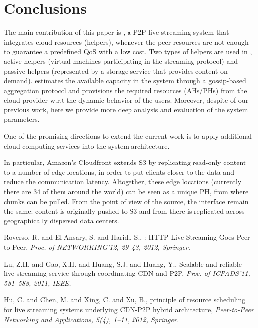 {\section{Conclusions} \label{sec:conclusion}

The main contribution of this paper is \clive, a P2P live streaming system
that integrates cloud resources (helpers), whenever the peer resources are not
enough to guarantee a predefined QoS with a low cost. Two types of helpers are
used in \clive, active helpers (virtual machines participating in the streaming
protocol) and passive helpers (represented by a storage service that
provides content on demand). \clive estimates the available capacity in the
system through a gossip-based aggregation protocol and provisions the required
resources (AHs/PHs) from the cloud provider w.r.t the dynamic behavior of the
users.
%
Moreover, despite of our previous \clive work, here we provide more deep analysis
and evaluation of the system parameters.

One of the promising directions to extend the current work is to apply 
additional cloud computing services into the system architecture.

In particular, Amazon's Cloudfront extends S3 by
replicating read-only content to a number of edge locations, in order
to put clients closer to the data and reduce the communication latency.
Altogether, these edge locations (currently there are $34$ of them around the
world) can be seen as a unique PH, from where chunks can be pulled. From the
point of view of the source, the interface remain the same: content is
originally pushed to S3 and from there is replicated across geographically
dispersed data centers.

\begin{thebibliography}{5}

Roverso, R. and El-Ansary, S. and Haridi, S.,
: {HTTP}-Live Streaming Goes Peer-to-Peer,
\newblock \emph{Proc. of NETWORKING'12, 29--43, 2012, Springer.}

Lu, Z.H. and Gao, X.H. and Huang, S.J. and Huang, Y.,
\newblock Scalable and reliable live streaming service through coordinating {CDN} and {P2P},
\newblock \emph{Proc. of ICPADS'11, 581--588, 2011, IEEE.}

Hu, C. and Chen, M. and Xing, C. and Xu, B.,
 principle of resource scheduling for live streaming systems underlying {CDN-P2P} hybrid architecture,
\newblock \emph{Peer-to-Peer Networking and Applications, 5(4), 1--11, 2012, Springer.}


\end{thebibliography}}
